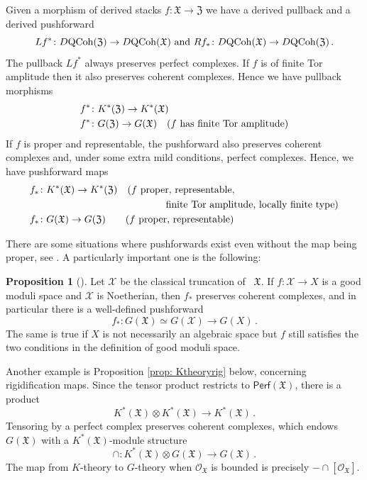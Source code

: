 \documentclass[12pt]{amsart}
\theoremstyle{definition}
\newtheorem{proposition}[definition]{Proposition}
\newcommand{\CO}{{\mathcal O}}
\newcommand{\CX}{{\mathcal X}}
\newcommand{\1}{\mathbf 1}
\newcommand{\FX}{{\mathfrak{X}}}
\newcommand{\FY}{\mathfrak{Z}}
\newcommand{\QCoh}{\mathrm{QCoh}}
\newcommand{\Perf}{\mathsf{Perf}}
\begin{document}
Given a morphism of derived stacks $f\colon \FX\to \FY$ we have a derived pullback and a derived pushforward
\[Lf^\ast \colon D\QCoh(\FY)\to D\QCoh(\FX)\textup{ and }Rf_\ast \colon D\QCoh(\FX)\to D\QCoh(\FY)\,.\]
The pullback $Lf^\ast$ always preserves perfect complexes. If $f$ is of finite Tor amplitude then it also preserves coherent complexes. Hence we have pullback morphisms
\begin{align*}
f^\ast&\colon K^\ast(\FY)\to K^\ast(\FX) \\
f^\ast&\colon G(\FY)\to G(\FX) \quad \textup{($f$ has finite Tor amplitude)}
\end{align*}
If $f$ is proper and representable, the pushforward also preserves coherent complexes and, under some extra mild conditions, perfect complexes. Hence, we have pushforward maps
\begin{align*}
f_\ast &\colon K^\ast(\FX)\to K^\ast(\FY) \quad \textup{($f$ proper, representable,} \\
& \hspace{4.5cm} \textup{finite Tor amplitude, locally finite type)}\\
f_\ast & \colon G(\FX)\to G(\FY) \quad\quad \textup{($f$ proper, representable)}
\end{align*}

There are some situations where pushforwards exist even without the map being proper, see \cite{HLpreygel}. A particularly important one is the following:

\begin{proposition}[{\cite[Theorem 4.16 (x)]{alper}}]\label{prop: pushforwardgoodmoduli}
    Let $\CX$ be the classical truncation of ~$\FX$. If $f\colon \CX\to X$ is a good moduli space and $\CX$ is Noetherian, then $f_\ast$ preserves coherent complexes, and in particular there is a well-defined pushforward
    \[f_\ast\colon G(\FX)\simeq G(\CX)\to G(X)\,.\]
    The same is true if $X$ is not necessarily an algebraic space but $f$ still satisfies the two conditions in the definition of good moduli space.
\end{proposition}

Another example is Proposition \ref{prop: Ktheoryrig} below, concerning rigidification maps. Since the tensor product restricts to $\Perf(\FX)$, there is a product
\[K^\ast(\FX)\otimes K^\ast(\FX)\to K^\ast(\FX)\,.\]
Tensoring by a perfect complex preserves coherent complexes, which endows $G(\FX)$ with a $K^\ast(\FX)$-module structure
\[\cap \colon K^\ast(\FX)\otimes G(\FX)\to G(\FX)\,.\]
The map from $K$-theory to $G$-theory when $\CO_\FX$ is bounded is precisely $-\cap [\CO_\FX]$.
\end{document}
